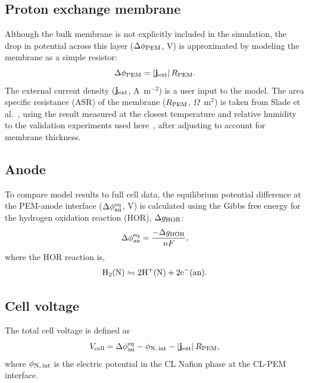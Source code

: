 \documentclass[final,3p,times,twocolumn]{elsarticle}    %
\begin{document}
\subsection{Proton exchange membrane}
\label{sect:pem}
Although the bulk membrane is not explicitly included in the simulation, the drop in potential across this layer ($\Delta \phi_{\rm PEM}$, V) is approximated by modeling the membrane as a simple resistor:
\begin{equation}
    \Delta \phi_{\rm PEM} = \lvert{\bf j}_{\rm ext}\rvert\, R_{\rm PEM}.
\end{equation}
The external current density (${\bf j}_{\rm ext}$, A~m$^{-2}$) is a user input to the model. The area specific resistance (ASR) of the membrane ($R_{\rm PEM}$, $\Omega$~m$^2$) is taken from Slade et al.~\cite{bib:slade_2002}, using the result measured at the closest temperature and relative humidity to the validation experiments used here~\cite{bib:owejan_2013}, after adjusting to account for membrane thickness.

\subsection{Anode}
\label{sect:anode}
To compare model results to full cell data, the equilibrium potential difference at the PEM-anode interface ($\Delta \phi_{\rm an}^{\rm eq}$, V) is calculated using the Gibbs free energy for the hydrogen oxidation reaction (HOR), $\Delta g_{\rm HOR}$:
\begin{equation} \label{eq:phi-anode}
    \Delta \phi_{\rm an}^{\rm eq} = \frac{-\Delta g_{\rm HOR}}{n F},
\end{equation}
where the HOR reaction is,
\begin{equation}
    {\rm H_2(N) \leftrightharpoons 2H^{+}(N) + 2e^{-}(an).}
\end{equation}

\subsection{Cell voltage}
The total cell voltage is defined as
\begin{equation}
    V_{\rm cell} = \Delta \phi_{\rm an}^{\rm eq} - \phi_{\rm N,\, int} - \vert{\bf j}_{\rm ext}\rvert\, R_{\rm PEM},
\end{equation}
where $\phi_{\rm N,\, int}$ is the electric potential in the CL Nafion phase at the CL-PEM interface.
\end{document}
